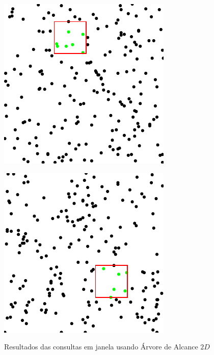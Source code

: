 \begin{figure}[ht!]
\centering
\begin{minipage}{.5\textwidth}
  \centering
  \includegraphics[width=.8\linewidth]{images/rt_t1.pdf}

  \label{fig:test1}
\end{minipage}%
\begin{minipage}{.5\textwidth}
  \centering
  
  \includegraphics[width=.8\linewidth]{images/rt_t2.pdf}
  \label{fig:test2}
 
\end{minipage}
 \caption{Resultados das consultas em janela usando Árvore de Alcance $2D$}
\end{figure}

\clearpage
